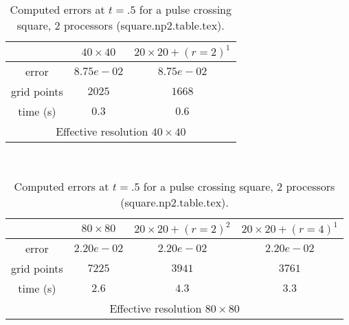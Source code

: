 \begin{table}[hbt]
\footnotesize
\begin{center}
\begin{tabular}{|c|c|c|}  \hline 
            & $40\times 40$  & $20\times20+ (r=2)^1$  \\   \hline 
 error      & $8.75e-02$     & $8.75e-02$  \\  
grid points & $2025$   &   $1668$     \\ 
time (s)    & $0.3$   &  $0.6$      \\ 
 \hline 
 \multicolumn{3}{c}{Effective resolution $40\times40$} \\ 
 \end{tabular}  \\ 
\vspace{.25\baselineskip}
\begin{tabular}{|c|c|c|c|}                   \hline 
       &  $80\times 80$ & $20\times20+ (r=2)^2$ & $20\times20+ (r=4)^1$  \\   \hline 
 error       & $2.20e-02$      & $2.20e-02$  & $2.20e-02$  \\  
 grid points &  $7225$  &  $3941$      &  $ 3761$      \\ 
 time (s)    &    $2.6$        &   $4.3$           &  $3.3$   \\ 
  \hline 
 \multicolumn{4}{c}{Effective resolution $80\times80$}  \\   
 \end{tabular}  
 \end{center}  
 \caption{Computed errors at $t=.5$ for a pulse crossing square, 2 processors (square.np2.table.tex).}  
 \label{tab:amrh.square}  
 \end{table}  
